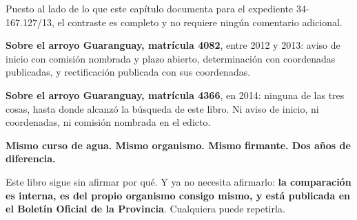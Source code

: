 \begin{cautela}
Puesto al lado de lo que este capítulo documenta para el expediente 34-167.127/13, el contraste
es completo y no requiere ningún comentario adicional.

\textbf{Sobre el arroyo Guaranguay, matrícula 4082}, entre 2012 y 2013: aviso de inicio con
comisión nombrada y plazo abierto, determinación con coordenadas publicadas, y rectificación
publicada con sus coordenadas.

\textbf{Sobre el arroyo Guaranguay, matrícula 4366}, en 2014: ninguna de las tres cosas, hasta donde alcanzó la búsqueda de este libro. Ni
aviso de inicio, ni coordenadas, ni comisión nombrada en el edicto.

\textbf{Mismo curso de agua. Mismo organismo. Mismo firmante. Dos años de diferencia.}

Este libro sigue sin afirmar por qué. Y ya no necesita afirmarlo: \textbf{la comparación es
interna, es del propio organismo consigo mismo, y está publicada en el Boletín Oficial de la
Provincia}. Cualquiera puede repetirla.
\end{cautela}


